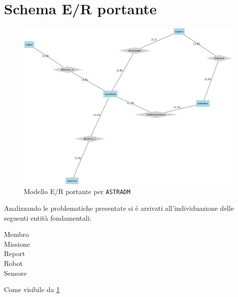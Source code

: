 \section{Schema E/R portante}
\begin{figure}
\includegraphics[width=\linewidth]{images/er-portante.png}
\caption{Modello E/R portante per \texttt{ASTRADM}}
\label{fig:er-portante}
\end{figure}           
Analizzando le problematiche presentate si è arrivati all'individuazione delle
seguenti entità fondamentali:
\begin{description}
\item[Membro] 
\item[Missione]
\item[Report]
\item[Robot]
\item[Sensore]
\end{description}
Come visibile da \ref{fig:er-portante}

